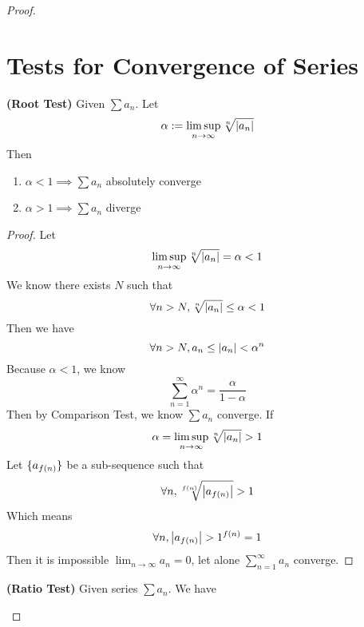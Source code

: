 \documentclass{report}
\begin{document}
\begin{proof}
\section{Tests for Convergence of Series}
\begin{theorem}
\label{2.5.1}
\textbf{(Root Test)} Given $\sum a_n$. Let
\begin{equation}
\alpha:= \limsup_{n\to\infty} \sqrt[n]{\left|a_n\right|} 
\end{equation}
Then 
\begin{enumerate}[label=(\alph*)]
  \item $\alpha <1\implies \sum a_n$ absolutely converge\\
  \item $\alpha >1\implies \sum a_n$ diverge
\end{enumerate}
\end{theorem}
\begin{proof}
Let 
\begin{equation}
\limsup_{n\to\infty} \sqrt[n]{\left|a_n\right|} =\alpha <1
\end{equation}
We know there exists $N$ such that
 \begin{equation}
\forall n>N, \sqrt[n]{\left|a_n\right|}\leq \alpha  <1 
\end{equation}
Then we have
\begin{equation}
\forall n>N, a_n\leq \left|a_n\right|<\alpha  ^n
\end{equation}
Because $\alpha <1$, we know 
\begin{equation}
\sum_{n=1}^\infty \alpha ^n=\frac{\alpha }{1-\alpha  }
\end{equation}
Then by Comparison Test, we know $\sum a_n$ converge. If
\begin{equation}
\alpha =\limsup_{n\to\infty} \sqrt[n]{\left|a_n\right|}>1
\end{equation}
Let $\{ a_{f(n)} \}$ be a sub-sequence such that
\begin{equation}
  \forall n,\sqrt[f(n)]{\left|a_{f(n)}\right|}>1 
\end{equation}
Which means
\begin{equation}
\forall n, \abso{a_{f(n)}}>1^{f(n)}=1
\end{equation}
Then it is impossible $\lim_{n\to\infty}a_n=0$, let alone $\sum_{n=1}^\infty a_n$ converge.
\end{proof}
\begin{theorem}
\label{2.5.2}
\textbf{(Ratio Test)} Given series $\sum a_n$. We have
\begin{enumerate}[label=(\alph*)]

\end{enumerate}
\end{theorem}
\end{proof}
\end{document}
